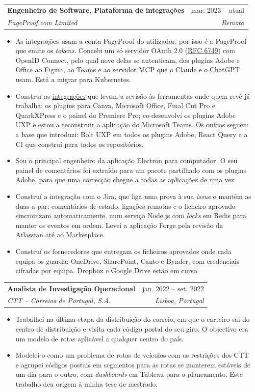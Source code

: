 \documentclass[a4paper,11pt]{article}
\makeatletter
\newcommand{\resumeItem}[1]{
  \item\small{
    {#1\vspace{-2pt}}
  }
}
\newcommand{\resumeSubheading}[4]{
  \vspace{-2pt}\item
    \begin{tabular*}{0.97\textwidth}[t]{l@{\extracolsep{\fill}}r}
      \textbf{#1} & #2 \\
      \textit{\small#3} & \textit{\small #4} \\
    \end{tabular*}\vspace{-7pt}
}
\newcommand{\resumeItemListStart}{\begin{itemize}}
\newcommand{\resumeItemListEnd}{\end{itemize}\vspace{-5pt}}
\makeatother
\begin{document}
    \resumeSubheading
      {Engenheiro de Software, Plataforma de integrações}{mar. 2023 -- atual}
      {PageProof.com Limited}{Remoto}
        \resumeItemListStart
            \resumeItem{As integrações usam a conta PageProof do utilizador, por isso é a PageProof que emite os \emph{tokens}. Concebi um só servidor OAuth 2.0 (\href{https://www.rfc-editor.org/rfc/rfc6749.html}{RFC 6749}) com OpenID Connect, pelo qual nove delas se autenticam, dos plugins Adobe e Office ao Figma, ao Teams e ao servidor MCP que o Claude e o ChatGPT usam. Está a migrar para Kubernetes.}
            \resumeItem{Construí as \href{https://pageproof.com/integrations}{integrações} que levam a revisão às ferramentas onde quem revê já trabalha: os plugins para Canva, Microsoft Office, Final Cut Pro e QuarkXPress e o painel do Premiere Pro; co-desenvolvi os plugins Adobe UXP e estou a reconstruir a aplicação do Microsoft Teams. Os outros seguem a base que introduzi: Bolt UXP em todos os plugins Adobe, React Query e a CI que construí para todos os repositórios.}
            \resumeItem{Sou o principal engenheiro da aplicação Electron para computador. O seu painel de comentários foi extraído para um pacote partilhado com os plugins Adobe, para que uma correcção chegue a todas as aplicações de uma vez.}
            \resumeItem{Construí a integração com o Jira, que liga uma prova à sua \emph{issue} e mantém as duas a par: comentários de estado, ligações remotas e o ficheiro aprovado sincronizam automaticamente, num serviço Node.js com \emph{locks} em Redis para manter os eventos em ordem. Levei a aplicação Forge pela revisão da Atlassian até ao Marketplace.}
            \resumeItem{Construí os fornecedores que entregam os ficheiros aprovados onde cada equipa os guarda: OneDrive, SharePoint, Canto e Bynder, com credenciais cifradas por equipa. Dropbox e Google Drive estão em curso.}
        \resumeItemListEnd

    \resumeSubheading
      {Analista de Investigação Operacional}{jan. 2022 -- set. 2022}
      {CTT – Correios de Portugal, S.A.}{Lisboa, Portugal}
        \resumeItemListStart
            \resumeItem{Trabalhei na última etapa da distribuição do correio, em que o carteiro sai do centro de distribuição e visita cada código postal do seu giro. O objectivo era um modelo de rotas aplicável a qualquer centro do país.}
            \resumeItem{Modelei-o como um problema de rotas de veículos com as restrições dos CTT e agrupei códigos postais em segmentos para as rotas se manterem estáveis de um dia para o outro, com \emph{dashboards} em Tableau para o planeamento. Este trabalho deu origem à minha tese de mestrado.}
        \resumeItemListEnd
\end{document}
